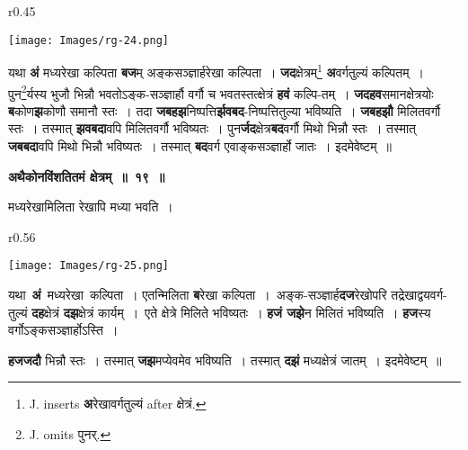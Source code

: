 \documentclass[11pt, openany]{book}
\begin{document}
\begin{wrapfigure}{r}{0.45\textwidth}
\vspace{-8mm}
\begin{center}
\texttt{[image: Images/rg-24.png]}
\end{center}
\vspace{-8mm}
\end{wrapfigure}

यथा \textbf{अं} मध्यरेखा कल्पिता \textbf{बज}म् अङ्कसञ्ज्ञार्हरेखा कल्पिता~। \textbf{जद}क्षेत्रम्\renewcommand{\thefootnote}{२}\footnote{{\en J. inserts} \textbf{अ}रेखावर्गतुल्यं {\en after} क्षेत्रं.} \textbf{अ}वर्गतुल्यं कल्पितम्~। पुन\renewcommand{\thefootnote}{३}\footnote{{\en J. omits} पुनर्.}र्यस्य भुजौ भिन्नौ भवतोऽङ्क-सञ्ज्ञार्हौ वर्गौ च भवतस्तत्क्षेत्रं \textbf{हवं} कल्पि-तम्~। \textbf{जदहव}समानक्षेत्रयोः \textbf{ब}कोण\textbf{झ}कोणौ समानौ स्तः~। तदा \textbf{जबहझ}निष्पत्ति\textbf{र्झवबद}-निष्पत्तितुल्या भविष्यति~। \textbf{जबहझौ} मिलितवर्गौ स्तः~। तस्मात् \textbf{झवबदा}वपि मिलितवर्गौ भविष्यतः~। पुन\textbf{र्जद}क्षेत्र\textbf{बद}वर्गौ मिथो भिन्नौ स्तः~। तस्मात् \textbf{जबबदा}वपि मिथो भिन्नौ भविष्यतः~। तस्मात् \textbf{बद}वर्ग एवाङ्कसञ्ज्ञार्हो जातः~। इदमेवेष्टम्~॥ 
\vspace{2mm}

\begin{center}
\textbf{\large अथैकोनविंशतितमं क्षेत्रम्~॥~१९~॥}
\end{center}

{\ab  मध्यरेखामिलिता रेखापि मध्या भवति~। }\\
 
\begin{wrapfigure}{r}{0.56\textwidth}
\vspace{-11mm}
\begin{center}
\texttt{[image: Images/rg-25.png]}
\end{center}
\vspace{-8mm}
\end{wrapfigure}

 यथा \,\textbf{अं} \,मध्यरेखा \,कल्पिता~। एतन्मिलिता \textbf{ब}रेखा कल्पिता~।~अङ्क-सञ्ज्ञार्ह\textbf{दज}रेखोपरि तद्रेखाद्वयवर्ग-तुल्यं \textbf{दह}क्षेत्रं \textbf{दझ}क्षेत्रं कार्यम्~।~एते क्षेत्रे मिलिते भविष्यतः~। \textbf{हजं  जझे}न मिलितं भविष्यति~। \textbf{हज}स्य वर्गोऽङ्कसञ्ज्ञार्होऽस्ति~। 

\newpage

\noindent \textbf{हजजदौ} भिन्नौ स्तः~। तस्मात् \textbf{जझ}मप्येवमेव भविष्यति~। तस्मात् \textbf{दझं} मध्यक्षेत्रं जातम्~। इदमेवेष्टम्~॥ 
\vspace{2mm}
\end{document}
